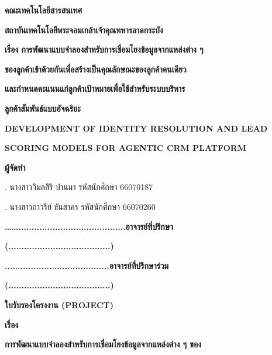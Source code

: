 \documentclass[12pt,a4paper]{report}
\begin{document}
\begin{center}\bfseries คณะเทคโนโลยีสารสนเทศ\end{center}
\begin{center}\bfseries สถาบันเทคโนโลยีพระจอมเกล้าเจ้าคุณทหารลาดกระบัง\end{center}
\begin{center}\bfseries เรื่อง การพัฒนาแบบจำลองสำหรับการเชื่อมโยงข้อมูลจากแหล่งต่าง ๆ\end{center}
\begin{center}\bfseries ของลูกค้าเข้าด้วยกันเพื่อสร้างเป็นคุณลักษณะของลูกค้าคนเดียว\end{center}
\begin{center}\bfseries และกำหนดคะแนนแก่ลูกค้าเป้าหมายเพื่อใช้สำหรับระบบบริหาร\end{center}
\begin{center}\bfseries ลูกค้าสัมพันธ์แบบอัจฉริยะ\end{center}
\begin{center}\bfseries DEVELOPMENT OF IDENTITY RESOLUTION AND LEAD\end{center}
\begin{center}\bfseries SCORING MODELS FOR AGENTIC CRM PLATFORM\end{center}
\begin{center}\bfseries ผู้จัดทํา\end{center}
. นางสาววิมลสิริ ปานมา รหัสนักศึกษา 66070187\par
{}. นางสาวถาวรีย์ ขันสาคร รหัสนักศึกษา 66070260\par
\begin{center}\bfseries …….........................................อาจารย์ที่ปรึกษา\end{center}
\begin{center}\bfseries (.......................................)\end{center}
\begin{center}\bfseries ........................................อาจารย์ที่ปรึกษาร่วม\end{center}
\begin{center}\bfseries (.......................................)\end{center}
\clearpage
\begin{center}\bfseries ใบรับรองโครงงาน (PROJECT)\end{center}
\begin{center}\bfseries เรื่อง\end{center}
\begin{center}\bfseries การพัฒนาแบบจำลองสำหรับการเชื่อมโยงข้อมูลจากแหล่งต่าง ๆ ของ\end{center}
\end{document}
